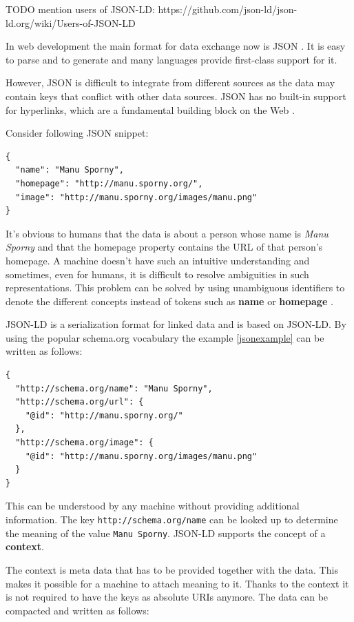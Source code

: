 TODO mention users of JSON-LD: https://github.com/json-ld/json-ld.org/wiki/Users-of-JSON-LD

In web development the main format for data exchange now is JSON \citep{jsonformat}. It is easy to parse and to generate and many languages provide first-class support for it.

However, JSON is difficult to integrate from different sources as the data may contain keys that conflict with other data sources. JSON has no built-in support for hyperlinks, which are a fundamental building block on the Web \citep{jsonldbasicconcepts}.

Consider following JSON snippet:

\lstset{language=JSON}
\begin{lstlisting}[caption=Data of a person in the JSON format, label=jsonexample]
{
  "name": "Manu Sporny",
  "homepage": "http://manu.sporny.org/",
  "image": "http://manu.sporny.org/images/manu.png"
}
\end{lstlisting}

It's obvious to humans that the data is about a person whose name is \textit{Manu Sporny} and that the homepage property contains the URL of that person's homepage. A machine doesn't have such an intuitive understanding and sometimes, even for humans, it is difficult to resolve ambiguities in such representations. This problem can be solved by using unambiguous identifiers to denote the different concepts instead of tokens such as \textbf{name} or \textbf{homepage} \citep{jsonldbasicconcepts}.

JSON-LD is a serialization format for linked data and is based on JSON-LD. By using the popular schema.org vocabulary the example \ref{jsonexample} can be written as follows:

\lstset{language=JSON}
\begin{lstlisting}[caption=Data of a person in the JSON-LD format, label=jsonldexample]
{
  "http://schema.org/name": "Manu Sporny",
  "http://schema.org/url": {
    "@id": "http://manu.sporny.org/"
  },
  "http://schema.org/image": {
    "@id": "http://manu.sporny.org/images/manu.png"
  }
}
\end{lstlisting}

This can be understood by any machine without providing additional information. The key \lstinline{http://schema.org/name} can be looked up to determine the meaning of the value \lstinline{Manu Sporny}. JSON-LD supports the concept of a \textbf{context}.

The context is meta data that has to be provided together with the data. This makes it possible for a machine to attach meaning to it. Thanks to the context it is not required to have the keys as absolute URIs anymore. The data can be compacted and written as follows:

